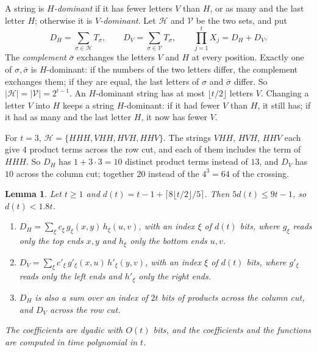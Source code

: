 \documentclass[11pt]{article}
\newtheorem{lemma}[theorem]{Lemma}
\newcommand{\Hs}{\mathcal H}
\newcommand{\Vs}{\mathcal V}
\begin{document}
A string is \emph{$H$-dominant} if it has fewer letters $V$ than $H$, or as many and the last letter $H$; otherwise it is \emph{$V$-dominant}. Let $\Hs$ and $\Vs$ be the two sets, and put
\[
D_H=\sum_{\sigma\in\Hs}T_\sigma,\qquad D_V=\sum_{\sigma\in\Vs}T_\sigma,\qquad\prod_{j=1}^tX_j=D_H+D_V .
\]
The \emph{complement} $\bar\sigma$ exchanges the letters $V$ and $H$ at every position. Exactly one of $\sigma,\bar\sigma$ is $H$-dominant: if the numbers of the two letters differ, the complement exchanges them; if they are equal, the last letters of $\sigma$ and $\bar\sigma$ differ. So $|\Hs|=|\Vs|=2^{t-1}$. An $H$-dominant string has at most $\lfloor t/2\rfloor$ letters $V$. Changing a letter $V$ into $H$ keeps a string $H$-dominant: if it had fewer $V$ than $H$, it still has; if it had as many and the last letter $H$, it now has fewer $V$.

For $t=3$, $\Hs=\{HHH,VHH,HVH,HHV\}$. The strings $VHH$, $HVH$, $HHV$ each give $4$ product terms across the row cut, and each of them includes the term of $HHH$. So $D_H$ has $1+3\cdot3=10$ distinct product terms instead of $13$, and $D_V$ has $10$ across the column cut; together $20$ instead of the $4^3=64$ of the crossing.

\begin{lemma}\label{lem:dom}
Let $t\ge1$ and $d(t)=t-1+\lceil8\lfloor t/2\rfloor/5\rceil$. Then $5d(t)\le9t-1$, so $d(t)<1.8t$.
\begin{enumerate}\setlength{\itemsep}{0pt}
\item $D_H=\sum_\xi c_\xi\,g_\xi(x,y)\,h_\xi(u,v)$, with an index $\xi$ of $d(t)$ bits, where $g_\xi$ reads only the top ends $x,y$ and $h_\xi$ only the bottom ends $u,v$.
\item $D_V=\sum_\xi c'_\xi\,g'_\xi(x,u)\,h'_\xi(y,v)$, with an index $\xi$ of $d(t)$ bits, where $g'_\xi$ reads only the left ends and $h'_\xi$ only the right ends.
\item $D_H$ is also a sum over an index of $2t$ bits of products across the column cut, and $D_V$ across the row cut.
\end{enumerate}
The coefficients are dyadic with $O(t)$ bits, and the coefficients and the functions are computed in time polynomial in $t$.
\end{lemma}
\end{document}
